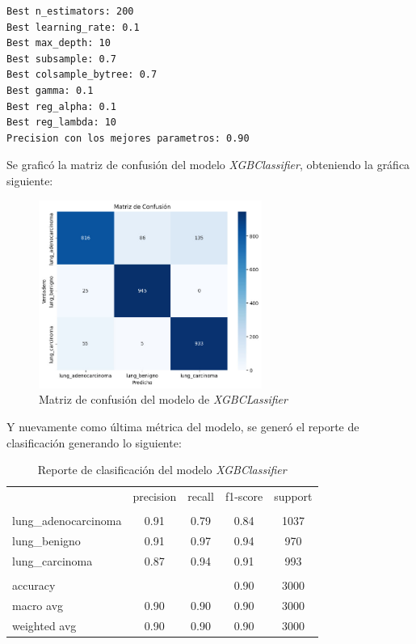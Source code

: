 
\begin{lstlisting}[caption={Impresión mejores parámetros y evaluación del modelo}]
Best n_estimators: 200
Best learning_rate: 0.1
Best max_depth: 10
Best subsample: 0.7
Best colsample_bytree: 0.7
Best gamma: 0.1
Best reg_alpha: 0.1
Best reg_lambda: 10
Precision con los mejores parametros: 0.90
\end{lstlisting}

Se graficó la matriz de confusión del modelo \textit{XGBClassifier}, obteniendo la gráfica siguiente: \\

\begin{figure}[H]
    \centering
    \includegraphics[width=0.65\textwidth]{Francisco/Imagenes resultados/CMXGB.jpeg} 
    \caption{Matriz de confusión del modelo de \textit{XGBCLassifier}}
\end{figure}

Y nuevamente como última métrica del modelo, se generó el reporte de clasificación generando lo siguiente:

\begin{table}[H]
    \centering
    \begin{tabular}{l c c c c}

         & precision & recall & f1-score & support \\
        \\
        lung\_adenocarcinoma & 0.91 & 0.79 & 0.84 & 1037 \\
        lung\_benigno & 0.91 & 0.97 & 0.94 & 970 \\
        lung\_carcinoma & 0.87 & 0.94 & 0.91 & 993 \\
        \\
        accuracy &  &  & 0.90 & 3000 \\
        macro avg & 0.90 & 0.90 & 0.90 & 3000 \\
        weighted avg & 0.90 & 0.90 & 0.90 & 3000
    
    \end{tabular}
    \caption{Reporte de clasificación del modelo \textit{XGBClassifier}}
\end{table}

